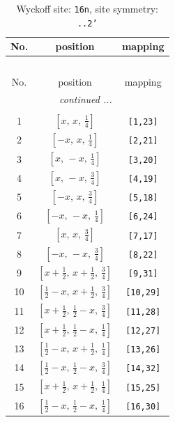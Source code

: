\documentclass[fleqn,8pt]{jsarticle}
\begin{document}
\renewcommand{\arraystretch}{1.2}
\begin{longtable}{ccc}
\caption{Wyckoff site: {\tt 16n}, site symmetry: {\tt ..2'}}
 \\
 \hline \hline
No. & position & mapping \\ \hline \endfirsthead

\multicolumn{2}{l}{\tablename\ \thetable{}} \\
 \hline \hline
No. & position & mapping \\ \hline \endhead

 \hline \hline
\multicolumn{2}{r}{\footnotesize\it continued ...} \\ \endfoot

 \hline \hline
\multicolumn{2}{r}{} \\ \endlastfoot

1 & $\left[ x,\, x,\, \frac{1}{4} \right]$ & {\tt [1,23]} \\ \hline
2 & $\left[ - x,\, x,\, \frac{1}{4} \right]$ & {\tt [2,21]} \\ \hline
3 & $\left[ x,\, - x,\, \frac{1}{4} \right]$ & {\tt [3,20]} \\ \hline
4 & $\left[ x,\, - x,\, \frac{3}{4} \right]$ & {\tt [4,19]} \\ \hline
5 & $\left[ - x,\, x,\, \frac{3}{4} \right]$ & {\tt [5,18]} \\ \hline
6 & $\left[ - x,\, - x,\, \frac{1}{4} \right]$ & {\tt [6,24]} \\ \hline
7 & $\left[ x,\, x,\, \frac{3}{4} \right]$ & {\tt [7,17]} \\ \hline
8 & $\left[ - x,\, - x,\, \frac{3}{4} \right]$ & {\tt [8,22]} \\ \hline
9 & $\left[ x + \frac{1}{2},\, x + \frac{1}{2},\, \frac{3}{4} \right]$ & {\tt [9,31]} \\ \hline
10 & $\left[ \frac{1}{2} - x,\, x + \frac{1}{2},\, \frac{3}{4} \right]$ & {\tt [10,29]} \\ \hline
11 & $\left[ x + \frac{1}{2},\, \frac{1}{2} - x,\, \frac{3}{4} \right]$ & {\tt [11,28]} \\ \hline
12 & $\left[ x + \frac{1}{2},\, \frac{1}{2} - x,\, \frac{1}{4} \right]$ & {\tt [12,27]} \\ \hline
13 & $\left[ \frac{1}{2} - x,\, x + \frac{1}{2},\, \frac{1}{4} \right]$ & {\tt [13,26]} \\ \hline
14 & $\left[ \frac{1}{2} - x,\, \frac{1}{2} - x,\, \frac{3}{4} \right]$ & {\tt [14,32]} \\ \hline
15 & $\left[ x + \frac{1}{2},\, x + \frac{1}{2},\, \frac{1}{4} \right]$ & {\tt [15,25]} \\ \hline
16 & $\left[ \frac{1}{2} - x,\, \frac{1}{2} - x,\, \frac{1}{4} \right]$ & {\tt [16,30]} \\
\end{longtable}
\end{document}
